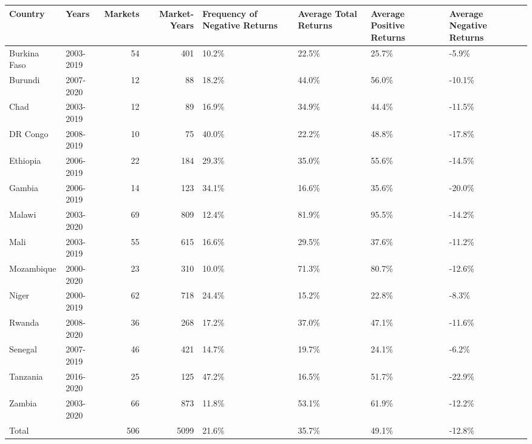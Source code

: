 \begin{table}[ht]
\centering
\begin{tabular}{llrrllll}
  \hline
Country & Years & Markets & Market-Years & Frequency of Negative Returns & Average Total Returns & Average Positive Returns & Average Negative Returns \\ 
  \hline
Burkina Faso & 2003-2019 &  54 & 401 & 10.2\% & 22.5\% & 25.7\% & -5.9\% \\ 
  Burundi & 2007-2020 &  12 &  88 & 18.2\% & 44.0\% & 56.0\% & -10.1\% \\ 
  Chad & 2003-2019 &  12 &  89 & 16.9\% & 34.9\% & 44.4\% & -11.5\% \\ 
  DR Congo & 2008-2019 &  10 &  75 & 40.0\% & 22.2\% & 48.8\% & -17.8\% \\ 
  Ethiopia & 2006-2019 &  22 & 184 & 29.3\% & 35.0\% & 55.6\% & -14.5\% \\ 
  Gambia & 2006-2019 &  14 & 123 & 34.1\% & 16.6\% & 35.6\% & -20.0\% \\ 
  Malawi & 2003-2020 &  69 & 809 & 12.4\% & 81.9\% & 95.5\% & -14.2\% \\ 
  Mali & 2003-2019 &  55 & 615 & 16.6\% & 29.5\% & 37.6\% & -11.2\% \\ 
  Mozambique & 2000-2020 &  23 & 310 & 10.0\% & 71.3\% & 80.7\% & -12.6\% \\ 
  Niger & 2000-2019 &  62 & 718 & 24.4\% & 15.2\% & 22.8\% & -8.3\% \\ 
  Rwanda & 2008-2020 &  36 & 268 & 17.2\% & 37.0\% & 47.1\% & -11.6\% \\ 
  Senegal & 2007-2019 &  46 & 421 & 14.7\% & 19.7\% & 24.1\% & -6.2\% \\ 
  Tanzania & 2016-2020 &  25 & 125 & 47.2\% & 16.5\% & 51.7\% & -22.9\% \\ 
  Zambia & 2003-2020 &  66 & 873 & 11.8\% & 53.1\% & 61.9\% & -12.2\% \\ 
  Total &   & 506 & 5099 & 21.6\% & 35.7\% & 49.1\% & -12.8\% \\ 
   \hline
\end{tabular}
\end{table}
